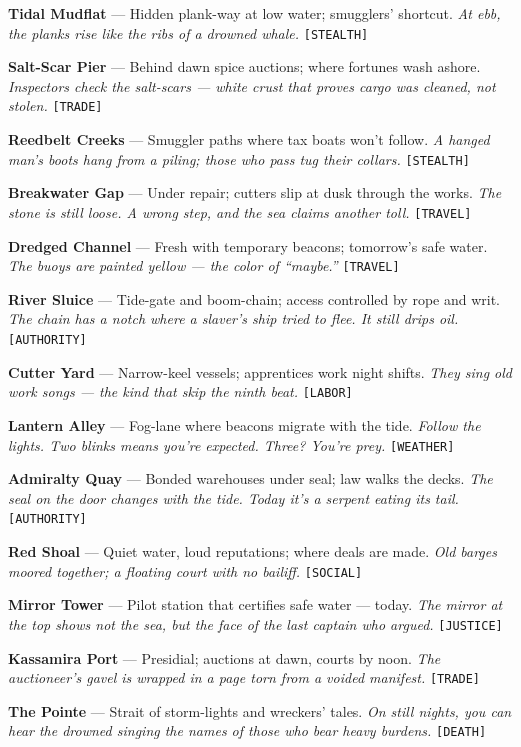 \begin{enumerate}[label={[\Alph*]}]
\setcounter{enumi}{1}
\item \textbf{Tidal Mudflat} --- Hidden plank-way at low water; smugglers' shortcut. \hfill \textit{At ebb, the planks rise like the ribs of a drowned whale.} \texttt{[STEALTH]}
\item \textbf{Salt-Scar Pier} --- Behind dawn spice auctions; where fortunes wash ashore. \hfill \textit{Inspectors check the salt-scars --- white crust that proves cargo was cleaned, not stolen.} \texttt{[TRADE]}
\item \textbf{Reedbelt Creeks} --- Smuggler paths where tax boats won't follow. \hfill \textit{A hanged man's boots hang from a piling; those who pass tug their collars.} \texttt{[STEALTH]}
\item \textbf{Breakwater Gap} --- Under repair; cutters slip at dusk through the works. \hfill \textit{The stone is still loose. A wrong step, and the sea claims another toll.} \texttt{[TRAVEL]}
\item \textbf{Dredged Channel} --- Fresh with temporary beacons; tomorrow's safe water. \hfill \textit{The buoys are painted yellow --- the color of ``maybe.''} \texttt{[TRAVEL]}
\item \textbf{River Sluice} --- Tide-gate and boom-chain; access controlled by rope and writ. \hfill \textit{The chain has a notch where a slaver's ship tried to flee. It still drips oil.} \texttt{[AUTHORITY]}
\item \textbf{Cutter Yard} --- Narrow-keel vessels; apprentices work night shifts. \hfill \textit{They sing old work songs --- the kind that skip the ninth beat.} \texttt{[LABOR]}
\item \textbf{Lantern Alley} --- Fog-lane where beacons migrate with the tide. \hfill \textit{Follow the lights. Two blinks means you're expected. Three? You're prey.} \texttt{[WEATHER]}
\item \textbf{Admiralty Quay} --- Bonded warehouses under seal; law walks the decks. \hfill \textit{The seal on the door changes with the tide. Today it's a serpent eating its tail.} \texttt{[AUTHORITY]}
\item \textbf{Red Shoal} --- Quiet water, loud reputations; where deals are made. \hfill \textit{Old barges moored together; a floating court with no bailiff.} \texttt{[SOCIAL]}
\item \textbf{Mirror Tower} --- Pilot station that certifies safe water --- today. \hfill \textit{The mirror at the top shows not the sea, but the face of the last captain who argued.} \texttt{[JUSTICE]}
\item \textbf{Kassamira Port} --- Presidial; auctions at dawn, courts by noon. \hfill \textit{The auctioneer's gavel is wrapped in a page torn from a voided manifest.} \texttt{[TRADE]}
\item \textbf{The Pointe} --- Strait of storm-lights and wreckers' tales. \hfill \textit{On still nights, you can hear the drowned singing the names of those who bear heavy burdens.} \texttt{[DEATH]}
\end{enumerate}


